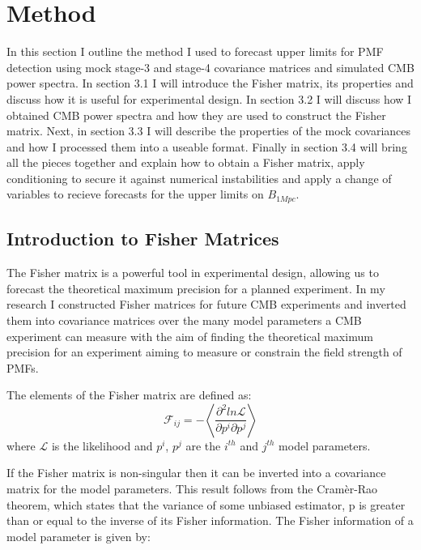 \section{Method}

In this section I outline the method I used to forecast upper limits for PMF detection using mock stage-3 and stage-4 covariance matrices and simulated CMB power spectra. In section 3.1 I will introduce the Fisher matrix, its properties and discuss how it is useful for experimental design. In section 3.2 I will discuss how I obtained CMB power spectra and how they are used to construct the Fisher matrix. Next, in section 3.3 I will describe the properties of the mock covariances and how I processed them into a useable format. Finally in section 3.4 will bring all the pieces together and explain how to obtain a Fisher matrix, apply conditioning to secure it against numerical instabilities and apply a change of variables to recieve forecasts for the upper limits on $B_{1Mpc}$.

\subsection{Introduction to Fisher Matrices}

The Fisher matrix is a powerful tool in experimental design, allowing us to forecast the theoretical maximum precision for a planned experiment. In my research I constructed Fisher matrices for future CMB experiments and inverted them into covariance matrices over the many model parameters a CMB experiment can measure with the aim of finding the theoretical maximum precision for an experiment aiming to measure or constrain the field strength of PMFs.

The elements of the Fisher matrix are defined as:
\begin{equation}
\mathcal{F}_{ij} = - \left \langle \frac{\partial^{2}ln{\mathcal{L}}}{\partial p^i\partial p^j } \right \rangle
\end{equation}
where $\mathcal{L}$ is the likelihood and $p^{i}$, $p^{j}$ are the $i^{th}$ and $j^{th}$ model parameters.
  
If the Fisher matrix is non-singular then it can be inverted into a covariance matrix for the model parameters. This result follows from the Cram\`{e}r-Rao theorem, which states that the variance of some unbiased estimator, p is greater than or equal to the inverse of its Fisher information. The Fisher information of a model parameter is given by:

